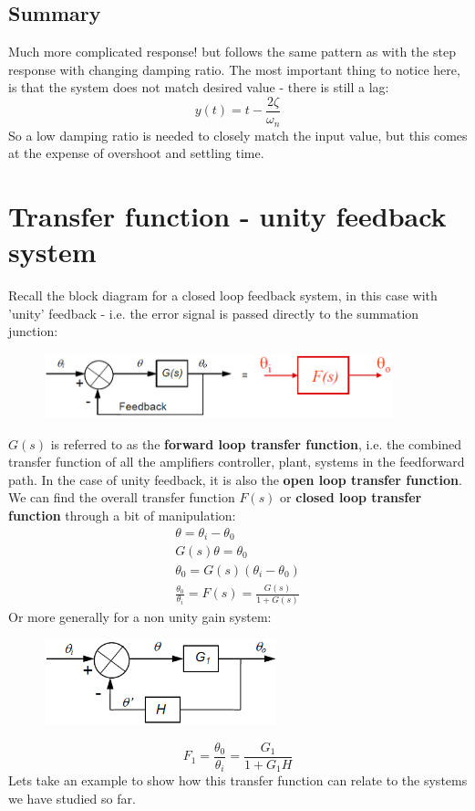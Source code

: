 \documentclass[class=report, crop=false, 12pt,a4paper]{standalone}
\begin{document}
\subsection{Summary}
Much more complicated response! but follows the same pattern as with the step response with changing damping ratio. The most important thing to notice here, is that the system does not match desired value - there is still a lag:
\begin{equation}
  y(t) = t - \frac{2\zeta}{\omega_n}
\end{equation}
So a low damping ratio is needed to closely match the input value, but this comes at the expense of overshoot and settling time.
\section{Transfer function - unity feedback system}
Recall the block diagram for a closed loop feedback system, in this case with 'unity' feedback - i.e. the error signal is passed directly to the summation junction:
\begin{figure}[H]
  \centering
  \includegraphics[width = 0.9\textwidth]{../img/diagram83.png}
\end{figure}
$G(s)$ is referred to as the \textbf{forward loop transfer function}, i.e. the combined transfer function of all the amplifiers controller, plant, systems in the feedforward path. In the case of unity feedback, it is also the \textbf{open loop transfer function}. We can find the overall transfer function $F(s)$ or \textbf{closed loop transfer function} through a bit of manipulation:
\begin{gather}
  \theta = \theta_i - \theta_0\\
  G(s)\theta = \theta_0\\
  \theta_0 = G(s) (\theta_i - \theta_0)\\
  \frac{\theta_0}{\theta_i} = F(s) = \frac{G(s)}{1 + G(s)}
\end{gather}
Or more generally for a non unity gain system:
\begin{figure}[H]
  \centering
  \includegraphics[width = 0.6\textwidth]{../img/diagram84.png}
\end{figure}
\begin{equation}
  F_1 = \frac{\theta_0}{\theta_i} = \frac{G_1}{1 + G_1 H}
\end{equation}
Lets take an example to show how this transfer function can relate to the systems we have studied so far.
\end{document}
